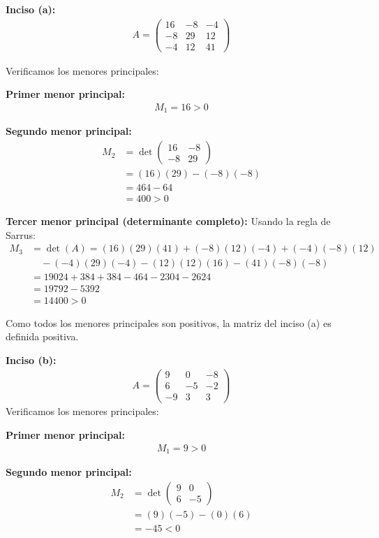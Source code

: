 \documentclass{article}
\begin{document}
\textbf{Inciso (a):}
\begin{align}
    A=\begin{pmatrix} 16 & -8 & -4\\ -8 & 29 & 12\\ -4 & 12 & 41 \end{pmatrix}
\end{align}

Verificamos los menores principales:

\textbf{Primer menor principal:}
\begin{align}
M_1 = 16 > 0
\end{align}

\textbf{Segundo menor principal:}
\begin{align}
M_2 &= \det\begin{pmatrix} 16 & -8 \\ -8 & 29 \end{pmatrix} \\
&= (16)(29) - (-8)(-8) \\
&= 464 - 64 \\
&= 400 > 0
\end{align}

\textbf{Tercer menor principal (determinante completo):}
Usando la regla de Sarrus:
\begin{align}
M_3 &= \det(A) = (16)(29)(41) + (-8)(12)(-4) + (-4)(-8)(12) \\
&\quad - (-4)(29)(-4) - (12)(12)(16) - (41)(-8)(-8) \\
&= 19024 + 384 + 384 - 464 - 2304 - 2624 \\
&= 19792 - 5392 \\
&= 14400 > 0
\end{align}

Como todos los menores principales son positivos, la matriz del inciso (a) es definida positiva.

\textbf{Inciso (b):}
\begin{align}
     A=\begin{pmatrix} 9 & 0 & -8\\ 6 & -5 & -2\\ -9 & 3 & 3 \end{pmatrix}
\end{align}
Verificamos los menores principales:

\textbf{Primer menor principal:}
\begin{align}
M_1 = 9 > 0
\end{align}

\textbf{Segundo menor principal:}
\begin{align}
M_2 &= \det\begin{pmatrix} 9 & 0 \\ 6 & -5 \end{pmatrix} \\
&= (9)(-5) - (0)(6) \\
&= -45 < 0
\end{align}
\end{document}
